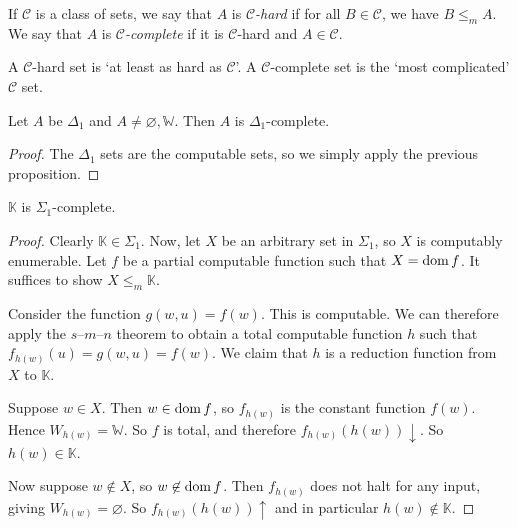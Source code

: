 \begin{definition}
	If \( \mathcal C \) is a class of sets, we say that \( A \) is \emph{\( \mathcal C \)-hard} if for all \( B \in \mathcal C \), we have \( B \leq_m A \).
	We say that \( A \) is \emph{\( \mathcal C \)-complete} if it is \( \mathcal C \)-hard and \( A \in \mathcal C \).
\end{definition}
\begin{remark}
	A \( \mathcal C \)-hard set is `at least as hard as \( \mathcal C \)'.
	A \( \mathcal C \)-complete set is the `most complicated' \( \mathcal C \) set.
\end{remark}
\begin{corollary}
	Let \( A \) be \( \Delta_1 \) and \( A \neq \varnothing, \mathbb W \).
	Then \( A \) is \( \Delta_1 \)-complete.
\end{corollary}
\begin{proof}
	The \( \Delta_1 \) sets are the computable sets, so we simply apply the previous proposition.
\end{proof}
\begin{theorem}
	\( \mathbb K \) is \( \Sigma_1 \)-complete.
\end{theorem}
\begin{proof}
	Clearly \( \mathbb K \in \Sigma_1 \).
	Now, let \( X \) be an arbitrary set in \( \Sigma_1 \), so \( X \) is computably enumerable.
	Let \( f \) be a partial computable function such that \( X = \operatorname{dom} f \).
	It suffices to show \( X \leq_m \mathbb K \).

	Consider the function \( g(w,u) = f(w) \).
	This is computable.
	We can therefore apply the \( s \)--\( m \)--\( n \) theorem to obtain a total computable function \( h \) such that \( f_{h(w)}(u) = g(w,u) = f(w) \).
	We claim that \( h \) is a reduction function from \( X \) to \( \mathbb K \).

	Suppose \( w \in X \).
	Then \( w \in \operatorname{dom} f \), so \( f_{h(w)} \) is the constant function \( f(w) \).
	Hence \( W_{h(w)} = \mathbb W \).
	So \( f \) is total, and therefore \( f_{h(w)}(h(w)) \downarrow \).
	So \( h(w) \in \mathbb K \).

	Now suppose \( w \not\in X \), so \( w \not\in \operatorname{dom} f \).
	Then \( f_{h(w)} \) does not halt for any input, giving \( W_{h(w)} = \varnothing \).
	So \( f_{h(w)}(h(w)) \uparrow \) and in particular \( h(w) \not\in \mathbb K \).
\end{proof}

